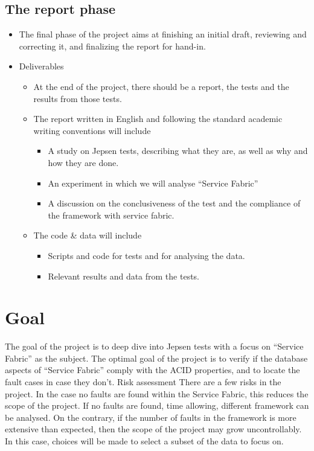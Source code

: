 \subsection{The report phase }
\begin{itemize}
\item The final phase of the project aims at finishing an initial draft, reviewing and correcting it, and finalizing the report for hand-in.
\item	Deliverables 
\begin{itemize}
\item	At the end of the project, there should be a report, the tests and the results from those tests. 
\item	The report written in English and following the standard academic writing conventions will include 
\begin{itemize}
\item	A study on Jepsen tests, describing what they are, as well as why and how they are done.
\item	An experiment in which we will analyse “Service Fabric”	
\item	A discussion on the conclusiveness of the test and the compliance of the framework with service fabric.
\end{itemize}
\item	The code \& data will include
\begin{itemize}
\item	Scripts and code for tests and for analysing the data.
\item	Relevant results and data from the tests. 
\end{itemize}
\end{itemize}
\end{itemize}

\section{Goal    }  
The goal of the project is to deep dive into Jepsen tests with a focus on “Service Fabric” as the subject. The optimal goal of the project is to verify if the database aspects of “Service Fabric” comply with the ACID properties, and to locate the fault cases in case they don’t.    
Risk assessment 
There are a few risks in the project. In the case no faults are found within the Service Fabric, this reduces the scope of the project. If no faults are found, time allowing, different framework can be analysed. On the contrary, if the number of faults in the framework is more extensive than expected, then the scope of the project may grow uncontrollably. In this case, choices will be made to select a subset of the data to focus on.
 

